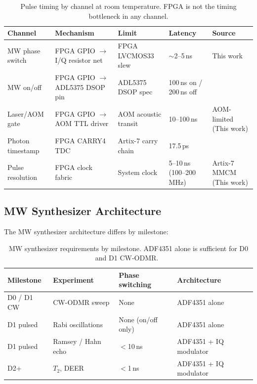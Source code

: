 \begin{table}[ht]
\centering
\caption{Pulse timing by channel at room temperature.
  FPGA is not the timing bottleneck in any channel.}
\label{tab:pulse_timing}
\small
\begin{tabular}{@{}p{2.5cm}p{3cm}p{2.5cm}p{1.5cm}p{3.5cm}@{}}
\toprule
Channel & Mechanism & Limit & Latency & Source \\
\midrule
MW phase switch & FPGA GPIO $\to$ I/Q resistor net & FPGA LVCMOS33 slew &
  $\sim$2--5\,ns & This work \\
MW on/off & FPGA GPIO $\to$ ADL5375 DSOP pin &
  ADL5375 DSOP spec & 100\,ns on / 200\,ns off & \cite{ADL5375datasheet}
  \\
Laser/AOM gate & FPGA GPIO $\to$ AOM TTL driver &
  AOM acoustic transit & 10--100\,ns & AOM-limited (This work) \\
Photon timestamp & FPGA CARRY4 TDC & Artix-7 carry chain &
  17.5\,ps & \cite{Lim2025}
  \\
Pulse resolution & FPGA clock fabric & System clock &
  5--10\,ns (100--200\,MHz) & Artix-7 MMCM (This work) \\
\bottomrule
\end{tabular}
\end{table}

\subsection{MW Synthesizer Architecture}
\label{sec:mw-arch}

The MW synthesizer architecture differs by milestone:

\begin{table}[ht]
\centering
\caption{MW synthesizer requirements by milestone. ADF4351 alone is sufficient
  for D0 and D1 CW-ODMR.~\cite{ADF4351datasheet}}
\label{tab:mw-milestones}
\small
\begin{tabular}{@{}p{2.2cm}p{3cm}p{3cm}p{4cm}@{}}
\toprule
Milestone & Experiment & Phase switching & Architecture \\
\midrule
D0 / D1 CW & CW-ODMR sweep & None & ADF4351 alone \\
D1 pulsed & Rabi oscillations & None (on/off only) & ADF4351 alone \\
D1 pulsed & Ramsey / Hahn echo & $<$10\,ns & ADF4351 + IQ modulator \\
D2+ & $T_2$, DEER & $<$1\,ns & ADF4351 + IQ modulator \\
\bottomrule
\end{tabular}
\end{table}

